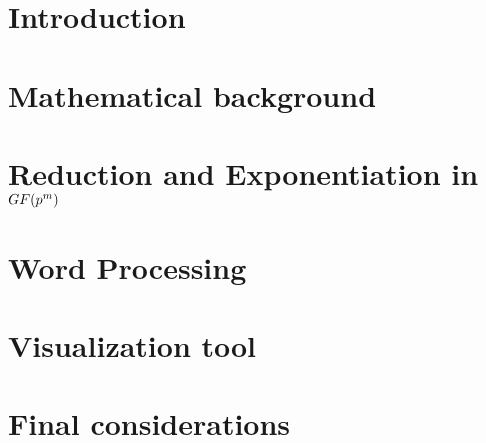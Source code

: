 \documentclass{ufscThesis}
\begin{document}
\capa  
\folhaderosto %
\paginaresumo
\paginaabstract
\listadefiguras
\listadetabelas 
\sumario

\chapter{Introduction}


\chapter{Mathematical background}\label{cap:background}


\chapter{Reduction and Exponentiation in $GF(\MakeLowercase{p}^\MakeLowercase{m})$}\label{chapters_reduction_squaring_2}


\chapter{Word Processing}\label{chapters_word_processing}


\chapter{Visualization tool}\label{chapters_visual_debugger}


\chapter{Final considerations}\label{chapters_final_considerations}

\end{document}
